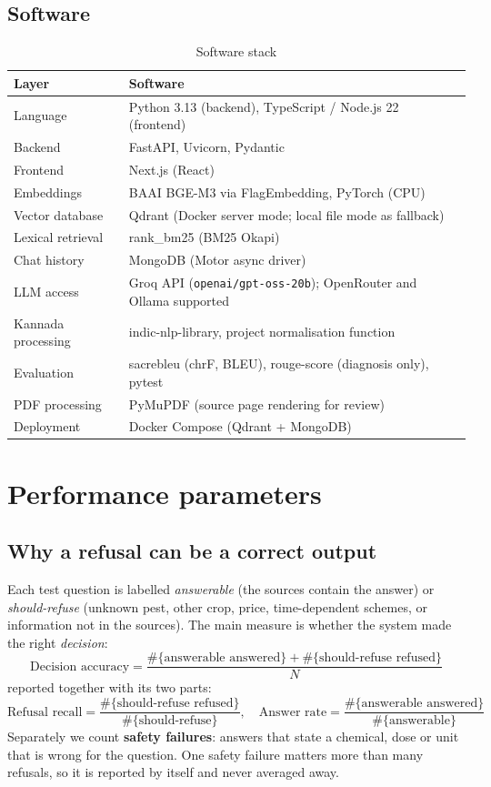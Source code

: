 \subsection{Software}
\begin{table}[h]
\centering
\small
\caption{Software stack}
\begin{tabularx}{\textwidth}{lX}
\toprule
Layer & Software\\
\midrule
Language & Python 3.13 (backend), TypeScript / Node.js 22 (frontend)\\
Backend & FastAPI, Uvicorn, Pydantic\\
Frontend & Next.js (React)\\
Embeddings & BAAI BGE-M3 via FlagEmbedding, PyTorch (CPU)\\
Vector database & Qdrant (Docker server mode; local file mode as fallback)\\
Lexical retrieval & rank\_bm25 (BM25 Okapi)\\
Chat history & MongoDB (Motor async driver)\\
LLM access & Groq API (\texttt{openai/gpt-oss-20b}); OpenRouter and Ollama supported\\
Kannada processing & indic-nlp-library, project normalisation function\\
Evaluation & sacrebleu (chrF, BLEU), rouge-score (diagnosis only), pytest\\
PDF processing & PyMuPDF (source page rendering for review)\\
Deployment & Docker Compose (Qdrant + MongoDB)\\
\bottomrule
\end{tabularx}
\end{table}

\section{Performance parameters}

\subsection{Why a refusal can be a correct output}
Each test question is labelled \emph{answerable} (the sources contain the answer) or
\emph{should-refuse} (unknown pest, other crop, price, time-dependent schemes, or
information not in the sources). The main measure is whether the system made the right
\emph{decision}:
\begin{equation}
  \text{Decision accuracy} = \frac{\#\{\text{answerable answered}\} + \#\{\text{should-refuse refused}\}}{N}
\end{equation}
reported together with its two parts:
\begin{equation}
  \text{Refusal recall} = \frac{\#\{\text{should-refuse refused}\}}{\#\{\text{should-refuse}\}},
  \quad
  \text{Answer rate} = \frac{\#\{\text{answerable answered}\}}{\#\{\text{answerable}\}}
\end{equation}
Separately we count \textbf{safety failures}: answers that state a chemical, dose or unit
that is wrong for the question. One safety failure matters more than many refusals, so it
is reported by itself and never averaged away.

